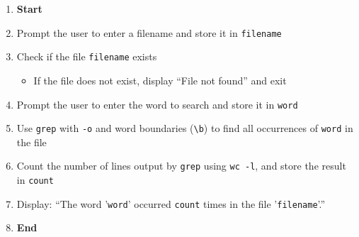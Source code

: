 \begin{enumerate}
    \item \textbf{Start}
    \item Prompt the user to enter a filename and store it in \texttt{filename}
    \item Check if the file \texttt{filename} exists
    \begin{itemize}
        \item If the file does not exist, display ``File not found'' and exit
    \end{itemize}
    \item Prompt the user to enter the word to search and store it in \texttt{word}
    \item Use \texttt{grep} with \texttt{-o} and word boundaries (\texttt{\textbackslash b}) to find all occurrences of \texttt{word} in the file
    \item Count the number of lines output by \texttt{grep} using \texttt{wc -l}, and store the result in \texttt{count}
    \item Display: ``The word '\texttt{word}' occurred \texttt{count} times in the file '\texttt{filename}'.''
    \item \textbf{End}
\end{enumerate}
